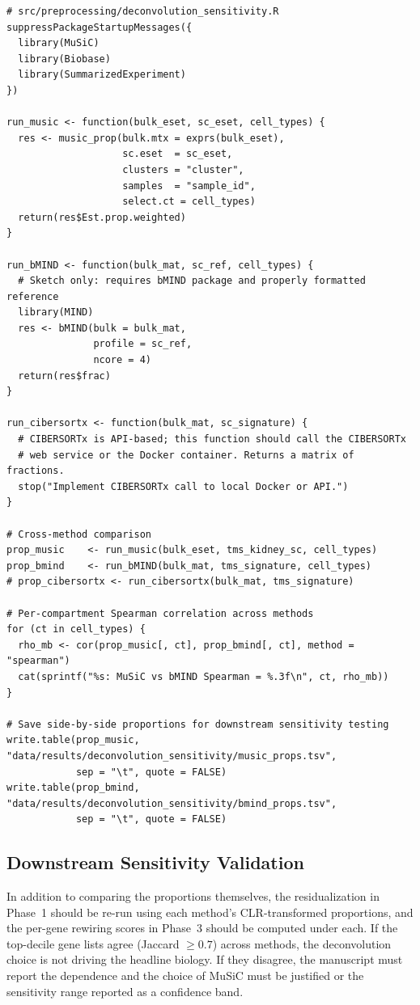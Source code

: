 \documentclass[11pt]{article}
\begin{document}
\begin{lstlisting}[style=rstyle,caption={Deconvolution sensitivity analysis.}]
# src/preprocessing/deconvolution_sensitivity.R
suppressPackageStartupMessages({
  library(MuSiC)
  library(Biobase)
  library(SummarizedExperiment)
})

run_music <- function(bulk_eset, sc_eset, cell_types) {
  res <- music_prop(bulk.mtx = exprs(bulk_eset),
                    sc.eset  = sc_eset,
                    clusters = "cluster",
                    samples  = "sample_id",
                    select.ct = cell_types)
  return(res$Est.prop.weighted)
}

run_bMIND <- function(bulk_mat, sc_ref, cell_types) {
  # Sketch only: requires bMIND package and properly formatted reference
  library(MIND)
  res <- bMIND(bulk = bulk_mat,
               profile = sc_ref,
               ncore = 4)
  return(res$frac)
}

run_cibersortx <- function(bulk_mat, sc_signature) {
  # CIBERSORTx is API-based; this function should call the CIBERSORTx
  # web service or the Docker container. Returns a matrix of fractions.
  stop("Implement CIBERSORTx call to local Docker or API.")
}

# Cross-method comparison
prop_music    <- run_music(bulk_eset, tms_kidney_sc, cell_types)
prop_bmind    <- run_bMIND(bulk_mat, tms_signature, cell_types)
# prop_cibersortx <- run_cibersortx(bulk_mat, tms_signature)

# Per-compartment Spearman correlation across methods
for (ct in cell_types) {
  rho_mb <- cor(prop_music[, ct], prop_bmind[, ct], method = "spearman")
  cat(sprintf("%s: MuSiC vs bMIND Spearman = %.3f\n", ct, rho_mb))
}

# Save side-by-side proportions for downstream sensitivity testing
write.table(prop_music, "data/results/deconvolution_sensitivity/music_props.tsv",
            sep = "\t", quote = FALSE)
write.table(prop_bmind, "data/results/deconvolution_sensitivity/bmind_props.tsv",
            sep = "\t", quote = FALSE)
\end{lstlisting}

\subsection{Downstream Sensitivity Validation}

In addition to comparing the proportions themselves, the residualization in Phase~1 should be re-run using each method's CLR-transformed proportions, and the per-gene rewiring scores in Phase~3 should be computed under each. If the top-decile gene lists agree (Jaccard $\geq 0.7$) across methods, the deconvolution choice is not driving the headline biology. If they disagree, the manuscript must report the dependence and the choice of MuSiC must be justified or the sensitivity range reported as a confidence band.
\end{document}
